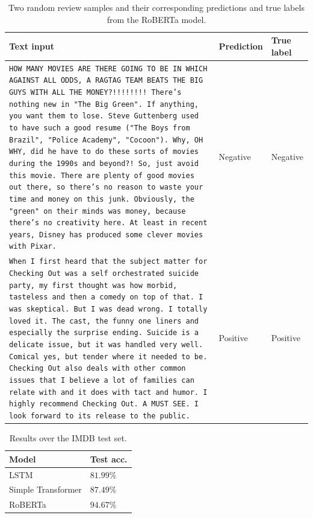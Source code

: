 {\footnotesize
\begin{table}[ht]
\caption{Two random review samples and their corresponding predictions and true labels from the RoBERTa model.}
\centering
\begin{tabularx}{\textwidth}{Xll}
Text input & Prediction & True label \\
\hline
 {\scriptsize \texttt{HOW MANY MOVIES ARE THERE GOING TO BE IN WHICH
AGAINST ALL ODDS, A RAGTAG TEAM BEATS THE BIG GUYS
WITH ALL THE MONEY?!!!!!!!! There's nothing new in
"The Big Green". If anything, you want them to
lose. Steve Guttenberg used to have such a good
resume ("The Boys from Brazil", "Police Academy",
"Cocoon"). Why, OH WHY, did he have to do these
sorts of movies during the 1990s and beyond?! So,
just avoid this movie. There are plenty of good
movies out there, so there's no reason to waste
your time and money on this junk. Obviously, the
"green" on their minds was money, because there's
no creativity here. At least in recent years,
Disney has produced some clever movies with Pixar.} } &   Negative & Negative   \\
\hline
 {\scriptsize \texttt{When I first heard that the subject matter for
Checking Out was a self orchestrated suicide
party, my first thought was how morbid, tasteless
and then a comedy on top of that. I was skeptical.
But I was dead wrong. I totally loved it. The
cast, the funny one liners and especially the
surprise ending. Suicide is a delicate issue, but
it was handled very well. Comical yes, but tender
where it needed to be. Checking Out also deals
with other common issues that I believe a lot of
families can relate with and it does with tact and
humor. I highly recommend Checking Out. A MUST
SEE. I look forward to its release to the public.} } &   Positive & Positive   \\

\end{tabularx}
\label{tab:examples}
\end{table}
}

\begin{table}[h]
\caption{Results over the IMDB test set.}
\centering
\begin{tabular}{ll}
Model & Test acc. \\
\hline
LSTM &  $81.99\%$ \\
Simple Transformer &  $87.49\%$ \\
RoBERTa &  $94.67\%$\\
\end{tabular}
\label{tab:nlp}
\end{table}











